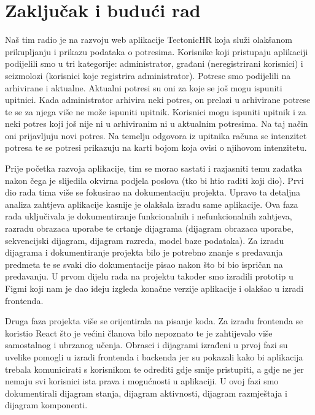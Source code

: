 \chapter{Zaključak i budući rad}
		
		Naš tim radio je na razvoju web aplikacije TectonicHR koja služi olakšanom prikupljanju i prikazu podataka o potresima. Korisnike koji pristupaju aplikaciji podijelili smo u tri kategorije: administrator, građani (neregistrirani korisnici) i seizmolozi (korisnici koje registrira administrator). Potrese smo podijelili na arhivirane i aktualne. Aktualni potresi su oni za koje se još mogu ispuniti upitnici. Kada administrator arhivira neki potres, on prelazi u arhivirane potrese te se za njega više ne može ispuniti upitnik. Korisnici mogu ispuniti upitnik i za neki potres koji još nije ni u arhiviranim ni u aktualnim potresima. Na taj način oni prijavljuju novi potres. Na temelju odgovora iz upitnika računa se intenzitet potresa te se potresi prikazuju na karti bojom koja ovisi o njihovom intenzitetu.
		
		Prije početka razvoja aplikacije, tim se morao sastati i razjasniti temu zadatka nakon čega je slijedila okvirna podjela poslova (tko bi htio raditi koji dio). Prvi dio rada tima više se fokusirao na dokumentaciju projekta. Upravo ta detaljna analiza zahtjeva aplikacije kasnije je olakšala izradu same aplikacije. Ova faza rada uključivala je dokumentiranje funkcionalnih i nefunkcionalnih zahtjeva, razradu obrazaca uporabe te crtanje dijagrama (dijagram obrazaca uporabe, sekvencijski dijagram, dijagram razreda, model baze podataka). Za izradu dijagrama i dokumentiranje projekta bilo je potrebno znanje s predavanja predmeta te se svaki dio dokumentacije pisao nakon što bi bio ispričan na predavanju. U prvom dijelu rada na projektu također smo izradili prototip u Figmi koji nam je dao ideju izgleda konačne verzije aplikacije i olakšao u izradi frontenda.
		
		Druga faza projekta više se orijentirala na pisanje koda. Za izradu frontenda se koristio React što je većini članova bilo nepoznato te je zahtijevalo više samostalnog i ubrzanog
		učenja. Obrasci i dijagrami izrađeni u prvoj fazi su uvelike pomogli u izradi frontenda i backenda jer su
		pokazali kako bi aplikacija trebala komunicirati s korisnikom te odrediti gdje smije pristupiti, a gdje ne jer nemaju svi korisnici ista prava i mogućnosti u aplikaciji. U ovoj fazi smo dokumentirali dijagram stanja, dijagram aktivnosti, dijagram razmještaja i dijagram komponenti.
		
